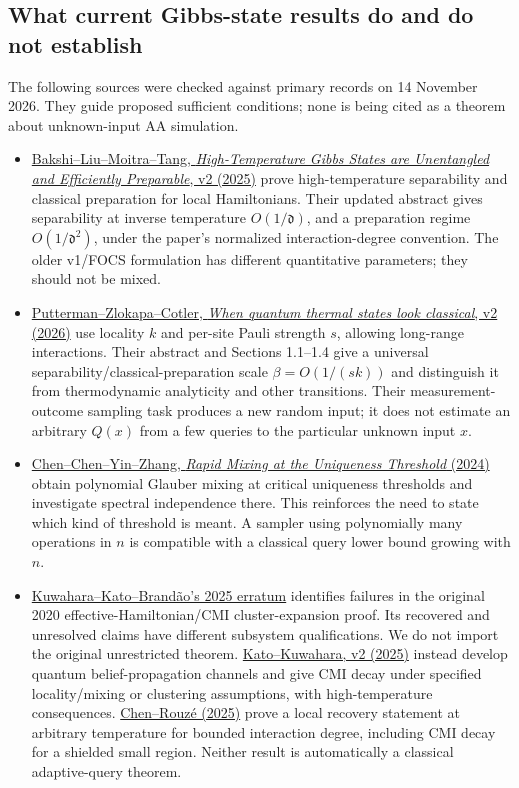 \subsection{What current Gibbs-state results do and do not establish}
\label{threshold_physics:literature}

The following sources were checked against primary records on
14 November 2026. They guide proposed sufficient conditions; none is
being cited as a theorem about unknown-input AA simulation.

\begin{itemize}
\item
\href{https://arxiv.org/abs/2403.16850v2}{Bakshi--Liu--Moitra--Tang,
\emph{High-Temperature Gibbs States are Unentangled and Efficiently
Preparable}, v2 (2025)} prove high-temperature separability and classical
preparation for local Hamiltonians. Their updated abstract gives
separability at inverse temperature \(O(1/\mathfrak d)\), and a
preparation regime \(O(1/\mathfrak d^2)\), under the paper's normalized
interaction-degree convention. The older v1/FOCS formulation has
different quantitative parameters; they should not be mixed.

\item
\href{https://arxiv.org/abs/2607.28536v2}{Putterman--Zlokapa--Cotler,
\emph{When quantum thermal states look classical}, v2 (2026)} use
locality \(k\) and per-site Pauli strength \(s\), allowing long-range
interactions. Their abstract and Sections 1.1--1.4 give a universal
separability/classical-preparation scale \(\beta=O(1/(sk))\) and
distinguish it from thermodynamic analyticity and other transitions.
Their measurement-outcome sampling task produces a new random input;
it does not estimate an arbitrary \(Q(x)\) from a few queries to the
particular unknown input \(x\).

\item
\href{https://arxiv.org/abs/2411.03413}{Chen--Chen--Yin--Zhang,
\emph{Rapid Mixing at the Uniqueness Threshold} (2024)} obtain polynomial
Glauber mixing at critical uniqueness thresholds and investigate spectral
independence there. This reinforces the need to state which kind of
threshold is meant. A sampler using polynomially many operations in
\(n\) is compatible with a classical query lower bound growing with
\(n\).

\item
\href{https://journals.aps.org/prl/abstract/10.1103/PhysRevLett.134.199901}
{Kuwahara--Kato--Brand\~ao's 2025 erratum} identifies failures in the
original 2020 effective-Hamiltonian/CMI cluster-expansion proof. Its
recovered and unresolved claims have different subsystem qualifications.
We do not import the original unrestricted theorem.
\href{https://arxiv.org/abs/2504.02235v2}{Kato--Kuwahara, v2 (2025)}
instead develop quantum belief-propagation channels and give CMI decay
under specified locality/mixing or clustering assumptions, with
high-temperature consequences.
\href{https://arxiv.org/abs/2504.02208}{Chen--Rouz\'e (2025)} prove a
local recovery statement at arbitrary temperature for bounded interaction
degree, including CMI decay for a shielded small region. Neither result
is automatically a classical adaptive-query theorem.
\end{itemize}

